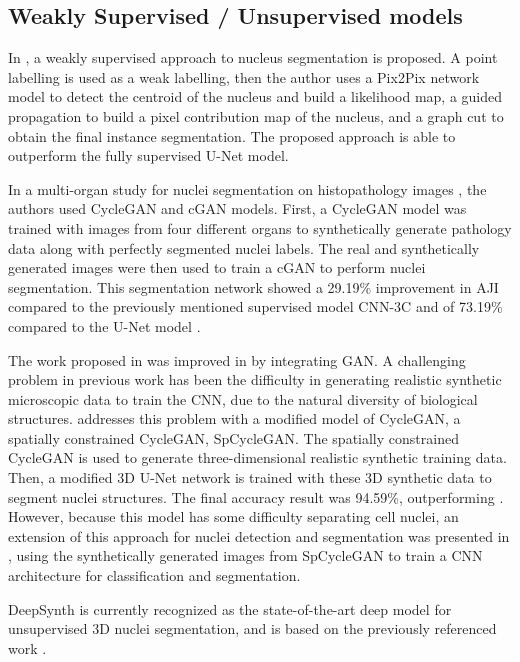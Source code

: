 \subsection{Weakly Supervised / Unsupervised models}

In \cite{weakly:GAN}, a weakly supervised approach to nucleus segmentation is proposed. A point labelling is used as a weak labelling, then the author uses a Pix2Pix network model to detect the centroid of the nucleus and build a likelihood map, a guided propagation to build a pixel contribution map of the nucleus, and a graph cut to obtain the final instance segmentation. The proposed approach is able to outperform the fully supervised U-Net \cite{Unet:2D} model.

In a multi-organ study for nuclei segmentation on histopathology images \cite{cGAN:cycleGAN}, the authors used CycleGAN and \ac{cGAN} models. First, a CycleGAN model was trained with images from four different organs to synthetically generate pathology data along with perfectly segmented nuclei labels. The real and synthetically generated images were then used to train a \ac{cGAN} to perform nuclei segmentation. This segmentation network showed a 29.19\% improvement in \ac{AJI} compared to the previously mentioned supervised model CNN-3C \cite{CNN3} and of 73.19\% compared to the U-Net model \cite{Unet:2D}.


The work proposed in \cite{SOTA:3DCNN} was improved in \cite{3D:CycleGAN} by integrating \ac{GAN}. A challenging problem in previous work has been the difficulty in generating realistic synthetic microscopic data to train the \ac{CNN}, due to the natural diversity of biological structures. \citet{3D:CycleGAN} addresses this problem with a modified model of CycleGAN, a spatially constrained CycleGAN, SpCycleGAN. The spatially constrained CycleGAN is used to generate three-dimensional realistic synthetic training data. Then, a modified \ac{3D} U-Net network is trained with these \ac{3D} synthetic data to segment nuclei structures. The final accuracy result was 94.59\%, outperforming \cite{SOTA:3DCNN}. However, because this model has some difficulty separating cell nuclei, an extension of this approach for nuclei detection and segmentation was presented in \cite{detection:3D}, using the synthetically generated images from SpCycleGAN to train a \ac{CNN} architecture for classification and segmentation.

DeepSynth \cite{deepsynth} is currently recognized as the state-of-the-art deep model for unsupervised \ac{3D} nuclei segmentation, and is based on the previously referenced work \cite{2dplus,SOTA:3DCNN,3D:CycleGAN}.

